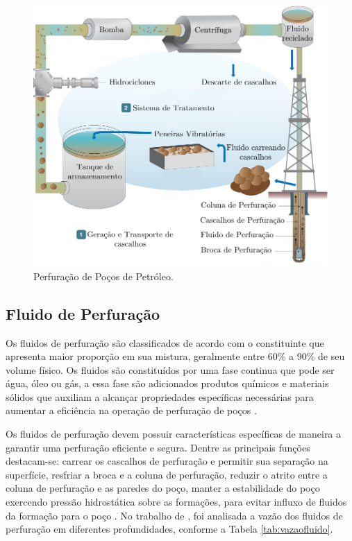 \begin{figure}[H]
    \centering
    \includegraphics[scale=0.94]{Figuras/esquemaseparacao.pdf}
    \caption{Perfuração de Poços de Petróleo.}
    \label{fig:esquemaseparacao}
\end{figure}

\subsection{Fluido de Perfuração}

Os fluidos de perfuração são classificados de acordo com o constituinte que apresenta maior proporção em sua mistura, geralmente entre 60\% a 90\% de seu volume físico. Os fluidos são constituídos por uma fase continua que pode ser água, óleo ou gás, a essa fase são adicionados produtos químicos e materiais sólidos que auxiliam a alcançar propriedades específicas necessárias para aumentar a eficiência na operação de perfuração de poços \cite{thomas}.

Os fluidos de perfuração devem possuir características específicas de maneira a garantir uma perfuração eficiente e segura. Dentre as principais funções destacam-se: carrear os cascalhos de perfuração e permitir sua separação na superfície, resfriar a broca e a coluna de perfuração, reduzir o atrito entre a coluna de perfuração e as paredes do poço, manter a estabilidade do poço exercendo pressão hidrostática sobre as formações, para evitar influxo de fluidos da formação para o poço \cite{silva}. No trabalho de , foi analisada a vazão dos fluidos de perfuração em diferentes profundidades, conforme a Tabela \ref{tab:vazaofluido}.

